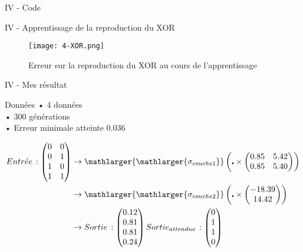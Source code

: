 \begin{frame}{IV - Code}
	
\end{frame}


\begin{frame}{IV - Apprentissage de la reproduction du XOR}
	\begin{figure}
		\centering
		\texttt{[image: 4-XOR.png]}
		\caption{Erreur sur la reproduction du XOR au cours de l'apprentissage}
	\end{figure}
\end{frame}


\begin{frame}{IV - Mes résultat}
	\begin{block}{Données}
		• 4 données \\
		• 300 générations \\
		• Erreur minimale atteinte 0.036
	\end{block}
	\begin{align*}
		Entr\acute{e} e\, :
		\begin{pmatrix}
			0 & 0 \\
			0 & 1 \\
			1 & 0 \\
			1 & 1
		\end{pmatrix}
		 & \to
		\mathlarger{\mathlarger{\sigma_{couche1}}}
		\left( \centerdot \times
		\begin{pmatrix}
				0.85 & 5.42 \\
				0.85 & 5.40 
			\end{pmatrix}
		\right) \\
		 & \to
		\mathlarger{\mathlarger{\sigma_{couche2}}}
		\left( \centerdot \times
		\begin{pmatrix}
				-18.39 \\
				14.42  
			\end{pmatrix}
		\right) \\
		 & \to
		Sortie\, :
		\begin{pmatrix}
			0.12 \\
			0.81 \\
			0.81 \\
			0.24
		\end{pmatrix}
		Sortie_{attendue}\, :
		\begin{pmatrix}
			0 \\
			1 \\
			1 \\
			0
		\end{pmatrix}
	\end{align*}
\end{frame}
